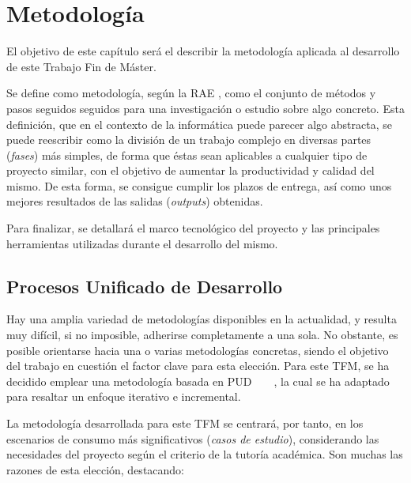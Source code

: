 
\chapter{Metodología}
\label{cap:Metodologia}

El objetivo de este capítulo será el describir la metodología aplicada al desarrollo de este Trabajo Fin de Máster.

Se define como metodología, según la RAE \cite{rae-metodologia}, como el conjunto de métodos y pasos seguidos seguidos para una investigación o estudio sobre algo concreto. Esta definición, que en el contexto de la informática puede parecer algo abstracta, se puede reescribir como la división de un trabajo complejo en diversas partes (\emph{fases}) más simples, de forma que éstas sean aplicables a cualquier tipo de proyecto similar, con el objetivo de aumentar la productividad y calidad del mismo. De esta forma, se consigue cumplir los plazos de entrega, así como unos mejores resultados de las salidas (\emph{outputs}) obtenidas.

Para finalizar, se detallará el marco tecnológico del proyecto y las principales herramientas utilizadas durante el desarrollo del mismo.


\section{Procesos Unificado de Desarrollo}
\label{met:pud}
Hay una amplia variedad de metodologías disponibles en la actualidad, y resulta muy difícil, si no imposible, adherirse completamente a una sola. No obstante, es posible orientarse hacia una o varias metodologías concretas, siendo el objetivo del trabajo en cuestión el factor clave para esta elección. Para este TFM, se ha decidido emplear una metodología basada en \ac{PUD} ~\cite{PUD-2} ~\cite{libro-PUD} , la cual se ha adaptado para resaltar un enfoque iterativo e incremental. 

La metodología desarrollada para este TFM se centrará, por tanto, en los escenarios de consumo más significativos (\emph{casos de estudio}), considerando las necesidades del proyecto según el criterio de la tutoría académica. Son muchas las razones de esta elección, destacando:

